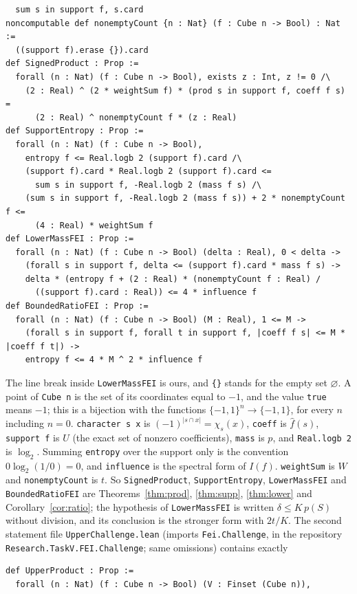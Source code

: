 \documentclass[11pt]{article}
\theoremstyle{definition}
\theoremstyle{remark}
\renewcommand{\lg}{\log_2}
\begin{document}
{{\begin{verbatim}
  sum s in support f, s.card
noncomputable def nonemptyCount {n : Nat} (f : Cube n -> Bool) : Nat :=
  ((support f).erase {}).card
def SignedProduct : Prop :=
  forall (n : Nat) (f : Cube n -> Bool), exists z : Int, z != 0 /\
    (2 : Real) ^ (2 * weightSum f) * (prod s in support f, coeff f s) =
      (2 : Real) ^ nonemptyCount f * (z : Real)
def SupportEntropy : Prop :=
  forall (n : Nat) (f : Cube n -> Bool),
    entropy f <= Real.logb 2 (support f).card /\
    (support f).card * Real.logb 2 (support f).card <=
      sum s in support f, -Real.logb 2 (mass f s) /\
    (sum s in support f, -Real.logb 2 (mass f s)) + 2 * nonemptyCount f <=
      (4 : Real) * weightSum f
def LowerMassFEI : Prop :=
  forall (n : Nat) (f : Cube n -> Bool) (delta : Real), 0 < delta ->
    (forall s in support f, delta <= (support f).card * mass f s) ->
    delta * (entropy f + (2 : Real) * (nonemptyCount f : Real) /
      ((support f).card : Real)) <= 4 * influence f
def BoundedRatioFEI : Prop :=
  forall (n : Nat) (f : Cube n -> Bool) (M : Real), 1 <= M ->
    (forall s in support f, forall t in support f, |coeff f s| <= M * |coeff f t|) ->
    entropy f <= 4 * M ^ 2 * influence f
\end{verbatim}}
\noindent The line break inside \texttt{LowerMassFEI} is ours, and \texttt{\{\}}
stands for the empty set $\varnothing$. A point of \texttt{Cube n} is the set of
its coordinates equal to $-1$, and the value \texttt{true} means $-1$; this is a
bijection with the functions $\{-1,1\}^n\to\{-1,1\}$, for every $n$ including
$n=0$. \texttt{character s x} is $(-1)^{|s\cap x|}=\chi_s(x)$, \texttt{coeff}
is $\hat f(s)$, \texttt{support f} is $U$ (the exact set of nonzero
coefficients), \texttt{mass} is $p$, and \texttt{Real.logb 2} is $\lg$. Summing
\texttt{entropy} over the support only is the convention $0\lg(1/0)=0$, and
\texttt{influence} is the spectral form of $I(f)$. \texttt{weightSum} is $W$ and
\texttt{nonemptyCount} is $t$. So \texttt{SignedProduct},
\texttt{SupportEntropy}, \texttt{LowerMassFEI} and \texttt{BoundedRatioFEI}
are Theorems~\ref{thm:prod}, \ref{thm:supp}, \ref{thm:lower} and
Corollary~\ref{cor:ratio}; the hypothesis of \texttt{LowerMassFEI} is written
$\delta\le K\,p(S)$ without division, and its conclusion is the stronger form
with $2t/K$. The second statement file \texttt{UpperChallenge.lean} (imports
\texttt{Fei.Challenge}, in the repository
\texttt{Research.TaskV.FEI.Challenge}; same omissions) contains exactly
{\footnotesize
\begin{verbatim}
def UpperProduct : Prop :=
  forall (n : Nat) (f : Cube n -> Bool) (V : Finset (Cube n)),

\end{verbatim}}}
\end{document}
